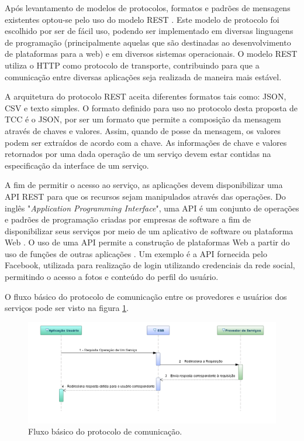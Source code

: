 Após levantamento de modelos de protocolos, formatos e padrões de mensagens existentes optou-se pelo uso do modelo REST \cite{rozlog_restesoap_2013}. Este modelo de protocolo foi escolhido por ser de fácil uso, podendo ser implementado em diversas linguagens de programação (principalmente aquelas que são destinadas ao desenvolvimento de plataformas para a web) e em diversos sistemas operacionais. O modelo REST utiliza o HTTP como protocolo de transporte, contribuindo para que a comunicação entre diversas aplicações seja realizada de maneira mais estável.

A arquitetura do protocolo REST aceita diferentes formatos tais como: JSON, CSV e texto simples. O formato definido para uso no protocolo desta proposta de TCC é o JSON, por ser um formato que permite a composição da mensagem através de chaves e valores. Assim, quando de posse da mensagem, os valores podem ser extraídos de acordo com a chave. As informações de chave e valores retornados por uma dada operação de um serviço devem estar contidas na especificação da interface de um serviço.


A fim de permitir o acesso ao serviço, as aplicações devem disponibilizar uma API REST para que os recursos sejam manipulados através das operações. Do inglês "\textit{Application Programming Interface}", uma API é um conjunto de operações e padrões de programação criadas por empresas de software a fim de disponibilizar seus serviços por meio de um aplicativo de software ou plataforma Web \cite{canaltech_o_2015}. O uso de uma API permite a construção de plataformas Web a partir do uso de funções de outras aplicações \cite{canaltech_o_2015}. Um exemplo é a API fornecida pelo Facebook, utilizada para realização de login utilizando credenciais da rede social, permitindo o acesso a fotos e conteúdo do perfil do usuário.

O fluxo básico do protocolo de comunicação entre os provedores e usuários dos serviços pode ser visto na figura \ref{fluxo_basico_protocolo}.

\begin{figure}[htb]
\centering
\includegraphics[width=1\textwidth]{figuras/fluxo_basico_protocolo.png}
\caption{Fluxo básico do protocolo de comunicação.}
\label{fluxo_basico_protocolo}
\end{figure}

